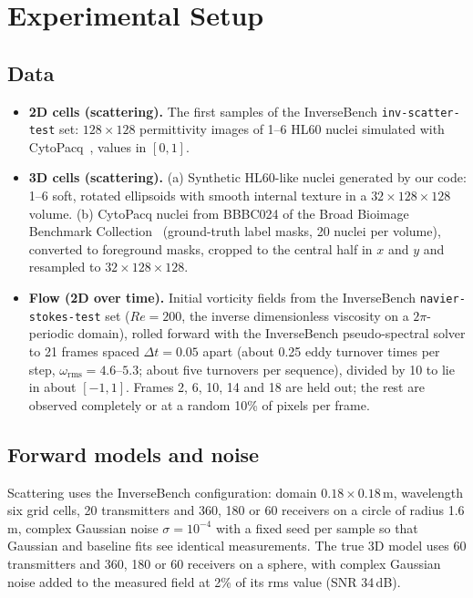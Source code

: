 \chapter{Experimental Setup}
\label{ch:setup}

\section{Data}
\begin{itemize}
  \item \textbf{2D cells (scattering).} The first samples of the InverseBench \texttt{inv-scatter-test} set:
  $128\times128$ permittivity images of 1--6 HL60 nuclei simulated with CytoPacq~\citep{wiesner2019cytopacq}, values in
  $[0,1]$.
  \item \textbf{3D cells (scattering).} (a) Synthetic HL60-like nuclei generated by our code: 1--6 soft, rotated
  ellipsoids with smooth internal texture in a $32\times128\times128$ volume. (b) CytoPacq nuclei from BBBC024
  of the Broad Bioimage Benchmark Collection~\citep{ljosa2012bbbc} (ground-truth label masks, 20 nuclei per volume),
  converted to foreground masks, cropped to the central half in $x$ and $y$ and resampled to
  $32\times128\times128$.
  \item \textbf{Flow (2D over time).} Initial vorticity fields from the InverseBench \texttt{navier-stokes-test} set
  ($Re=200$, the inverse dimensionless viscosity on a $2\pi$-periodic domain), rolled forward with the InverseBench
  pseudo-spectral solver to 21 frames spaced $\Delta t=0.05$ apart (about 0.25 eddy turnover times per step,
  $\omega_{\mathrm{rms}}=4.6$--$5.3$; about five turnovers per sequence), divided by 10 to lie in about $[-1,1]$. Frames 2, 6, 10, 14 and 18 are held out; the rest are observed
  completely or at a random 10\% of pixels per frame.
\end{itemize}

\section{Forward models and noise}
Scattering uses the InverseBench configuration: domain $0.18\times0.18$\,m, wavelength six grid cells, 20
transmitters and 360, 180 or 60 receivers on a circle of radius 1.6\,m, complex Gaussian noise $\sigma=10^{-4}$ with a
fixed seed per sample so that Gaussian and baseline fits see identical measurements. The true 3D model uses 60
transmitters and 360, 180 or 60 receivers on a sphere, with complex Gaussian noise added to the measured field at 2\%
of its rms value (SNR 34\,dB).


